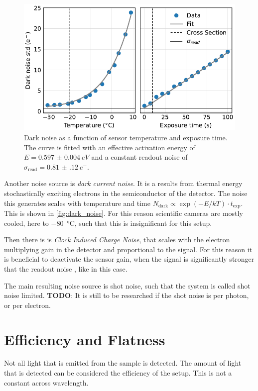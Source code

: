 \documentclass[
	parskip=half,
	a4paper,
]{scrarticle}
\begin{document}
\begin{figure}[hb]
    \centering
    \includegraphics{../analysis/figures/dark_noise.pdf}
    \caption{Dark noise as a function of sensor temperature and exposure time. The curve is fitted with an effective activation energy of $E = \SI{0.597(4)}{eV}$ and a constant readout noise of $\sigma_{\text{read}} = \SI{0.81(12)}{e^-}$.}
    \label{fig:dark_noise}
\end{figure}
Another noise source is \textit{dark current noise}. 
It is a results from thermal energy stochastically exciting electrons in the semiconductor of the detector. The noise this generates scales with temperature and time $N_\text{dark} \propto \exp(-E / k T) \cdot t_\text{exp}$. This is shown in \autoref{fig:dark_noise}.
For this reason scientific cameras are mostly cooled, here to \SI{-80}{\degreeCelsius}, such that this is insignificant for this setup.


Then there is is \textit{Clock Induced Charge Noise}, that scales with the electron multiplying gain in the detector and proportional to the signal. For this reason it is beneficial to deactivate the sensor gain, when the signal is significantly stronger that the readout noise \cite{andor_establishing_nodate}, like in this case.

The main resulting noise source is shot noise, such that the system is called shot noise limited.
\textbf{TODO}: It is still to be researched if the shot noise is per photon, or per electron.

\section{Efficiency and Flatness}
Not all light that is emitted from the sample is detected.
The amount of light that is detected can be considered the efficiency of the setup. This is not a constant across wavelength.
\end{document}
